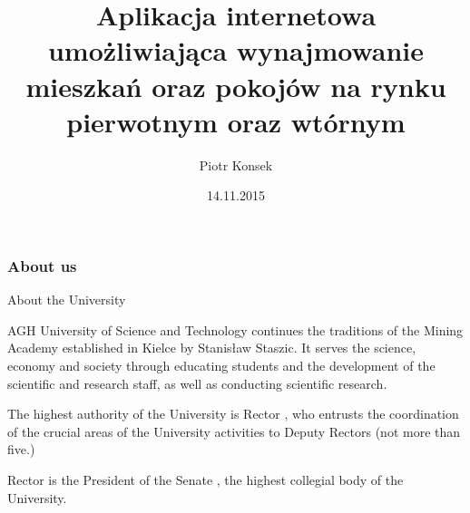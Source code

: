 \documentclass{beamer}
\title[Praca inżynierska]{Aplikacja internetowa umożliwiająca wynajmowanie mieszkań oraz pokojów na rynku pierwotnym oraz wtórnym}
\author[P. Konsek]{Piotr Konsek}
\date[2015]{14.11.2015}
\institute[AGH-UST]
{Informatyka\\ 
Wydział Elektrotechniki Automatyki Informatyki i Inżynierii\\
Biomedycznej
}
\begin{document}
{
 \begin{frame}
   \titlepage
 \end{frame}
}



\begin{frame}
\frametitle{About us}

\begin{block}{About the University}

AGH University of Science and Technology continues the traditions of the Mining Academy established in Kielce by Stanisław Staszic. It serves the science, economy and society through educating students and the development of the scientific and research staff, as well as conducting scientific research.

The highest authority of the University is Rector , who entrusts the coordination of the crucial areas of the University activities to Deputy Rectors (not more than five.)

Rector is the President of the Senate , the highest collegial body of the University. 
\end{block}
\end{frame}

\end{document}

